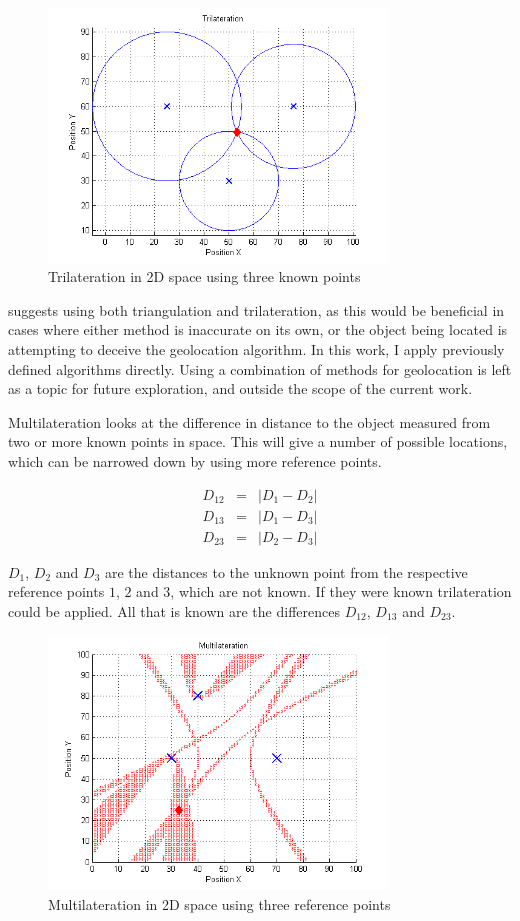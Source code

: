 \documentclass[10pt,a4paper]{book}
\begin{document}
\begin{figure}[H]
\centering
\includegraphics[width=90mm]{trilateration.png}
\caption{Trilateration in 2D space using three known points}
\label{trilateration}
\end{figure}

\citet{berle1986mixed} suggests using both triangulation and trilateration, as this would be beneficial in cases where either method is inaccurate on its own, or the object being located is attempting to deceive the geolocation algorithm. In this work, I apply previously defined algorithms directly. Using a combination of methods for geolocation is left as a topic for future exploration, and outside the scope of the current work.

\newpage
Multilateration looks at the difference in distance to the object measured from two or more known points in space. This will give a number of possible locations, which can be narrowed down by using more reference points. 

\begin{eqnarray}
D_{12} &=& | D_1 - D_2 |\\
D_{13} &=& | D_1 - D_3 |\\
D_{23} &=& | D_2 - D_3 |
\end{eqnarray}

$D_1$, $D_2$ and $D_3$ are the distances to the unknown point from the respective reference points $1$, $2$ and $3$, which are not known. If they were known trilateration could be applied. All that is known are the differences $D_{12}$, $D_{13}$ and $D_{23}$. 

\begin{figure}[H]
\centering
\includegraphics[width=90mm]{multilateration.png}
\caption{Multilateration in 2D space using three reference points}
\label{multilateration}
\end{figure}
\end{document}
